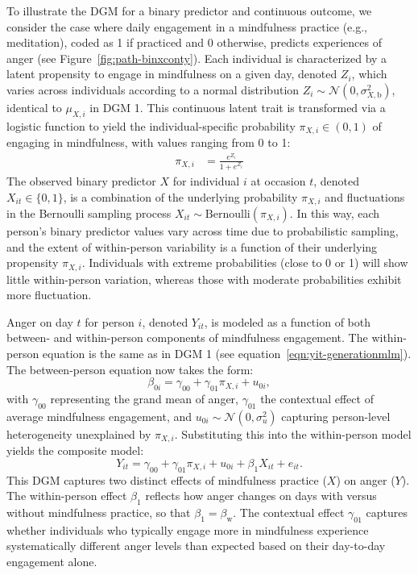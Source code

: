
To illustrate the DGM for a binary predictor and continuous outcome, we consider the case where daily engagement in a mindfulness practice (e.g., meditation), coded as 1 if practiced and 0 otherwise, predicts experiences of anger (see Figure~\ref{fig:path-binxconty}). Each individual is characterized by a latent propensity to engage in mindfulness on a given day, denoted \( Z_i \), which varies across individuals according to a normal distribution \( Z_i \sim \mathcal{N}(0, \sigma^2_{X,\text{b}}) \), identical to \( \mu_{X,i} \) in DGM 1. This continuous latent trait is transformed via a logistic function to yield the individual-specific probability \( \pi_{X,i} \in (0,1) \) of engaging in mindfulness, with values ranging from 0 to 1:
\begin{align}
    \pi_{X,i} &= \frac{e^{Z_i}}{1+ e^{Z_i}}
\end{align}
The observed binary predictor $X$ for individual $i$ at occasion $t$,  denoted \( X_{it} \in \{0,1\} \), is a combination of the underlying probability \( \pi_{X,i} \) and fluctuations in the Bernoulli sampling process $X_{it} \sim \text{Bernoulli}(\pi_{X,i})$. In this way, each person’s binary predictor values vary across time due to probabilistic sampling, and the extent of within-person variability is a function of their underlying propensity \( \pi_{X,i} \). Individuals with extreme probabilities (close to 0 or 1) will show little within-person variation, whereas those with moderate probabilities exhibit more fluctuation.

Anger on day \( t \) for person \( i \), denoted \( Y_{it} \), is modeled as a function of both between- and within-person components of mindfulness engagement. The within-person equation is the same as in DGM 1 (see equation~\ref{eqn:yit-generationmlm}). The between-person equation now takes the form:  
\begin{equation}
    \label{eqn:dgm2-betweenlevel}
    \beta_{0i} = \gamma_{00} + \gamma_{01} \pi_{X,i} + u_{0i},
\end{equation}
with \( \gamma_{00} \) representing the grand mean of anger, \( \gamma_{01} \) the contextual effect of average mindfulness engagement, and \( u_{0i} \sim \mathcal{N}(0, \sigma^2_u) \) capturing person-level heterogeneity unexplained by \( \pi_{X,i} \). Substituting this into the within-person model yields the composite model:
\begin{equation}
    Y_{it} = \gamma_{00} + \gamma_{01} \pi_{X,i} + u_{0i} + \beta_1 X_{it} + e_{it}.
\end{equation}
This DGM captures two distinct effects of mindfulness practice (\( X \)) on anger (\( Y \)). The within-person effect \( \beta_1 \) reflects how anger changes on days with versus without mindfulness practice, so that \( \beta_1 = \beta_{\text{w}}\). The contextual effect \( \gamma_{01} \) captures whether individuals who typically engage more in mindfulness experience systematically different anger levels than expected based on their day-to-day engagement alone. 

